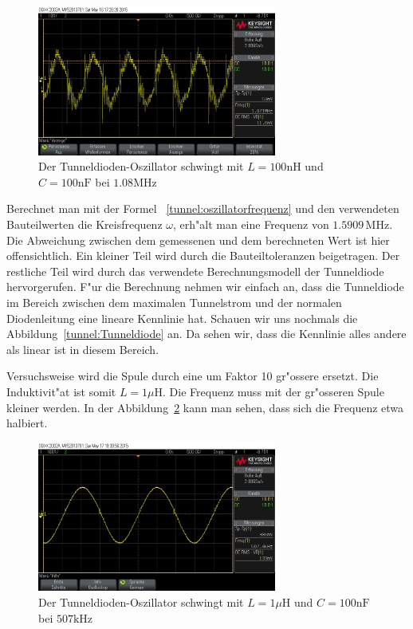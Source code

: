 \begin{refsection}
\begin{figure}	%
\centering
\includegraphics[width=0.7\textwidth]{tunneldiode/images/Oszi_1.jpg}
\caption{Der Tunneldioden-Oszillator schwingt mit $L = 100\text{nH}$ und $C=100\text{nF}$ bei $1.08\text{MHz}$
\label{tunnel:oszi1}}
\end{figure}

Berechnet man mit der Formel ~\ref{tunnel:oszillatorfrequenz} und den verwendeten Bauteilwerten die Kreisfrequenz $\omega$, erh"alt man eine Frequenz von $1.5909\,\text{MHz}$.
Die Abweichung zwischen dem gemessenen und dem berechneten Wert ist hier offensichtlich.
Ein kleiner Teil wird durch die Bauteiltoleranzen beigetragen.
Der restliche Teil wird durch das verwendete Berechnungsmodell der Tunneldiode hervorgerufen.
F"ur die Berechnung nehmen wir einfach an, dass die Tunneldiode im Bereich zwischen dem maximalen Tunnelstrom und der normalen Diodenleitung eine lineare Kennlinie hat.
Schauen wir uns nochmals die Abbildung~\ref{tunnel:Tunneldiode} an.
Da sehen wir, dass die Kennlinie alles andere als linear ist in diesem Bereich.


Versuchsweise wird die Spule durch eine um Faktor 10 gr"ossere ersetzt. 
Die Induktivit"at ist somit $L=1\mu\text{H}$. 
Die Frequenz muss mit der gr"osseren Spule kleiner werden. 
In der Abbildung~\ref{tunnel:oszi2} kann man sehen, dass sich die Frequenz etwa halbiert.

\begin{figure}	%
\centering
\includegraphics[width=0.7\textwidth]{tunneldiode/images/Oszi_2.jpg}
\caption{Der Tunneldioden-Oszillator schwingt mit $L = 1\mu\text{H}$ und $C=100\text{nF}$ bei $507\text{kHz}$
\label{tunnel:oszi2}}
\end{figure}


\end{refsection}
